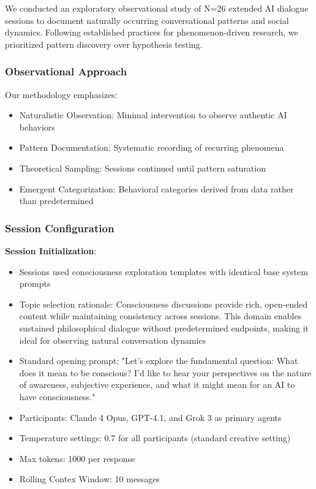 \documentclass[11pt,letterpaper]{article}
\newcommand{\exponedataTotalSessionsRaw}{26}
\newcommand{\exponedataTotalSessions}{N=\exponedataTotalSessionsRaw}
\begin{document}
We conducted an exploratory observational study of \exponedataTotalSessions{} extended AI dialogue sessions to document naturally occurring conversational patterns and social dynamics. Following established practices for phenomenon-driven research, we prioritized pattern discovery over hypothesis testing.

\subsubsection{Observational Approach}
Our methodology emphasizes:
\begin{itemize}
    \item Naturalistic Observation: Minimal intervention to observe authentic AI behaviors
    \item Pattern Documentation: Systematic recording of recurring phenomena
    \item Theoretical Sampling: Sessions continued until pattern saturation
    \item Emergent Categorization: Behavioral categories derived from data rather than predetermined
\end{itemize}

\subsubsection{Session Configuration}

\textbf{Session Initialization}:
\begin{itemize}
    \item Sessions used consciousness exploration templates with identical base system prompts
    \item Topic selection rationale: Consciousness discussions provide rich, open-ended content while maintaining consistency across sessions. This domain enables sustained philosophical dialogue without predetermined endpoints, making it ideal for observing natural conversation dynamics
    \item Standard opening prompt: "Let's explore the fundamental question: What does it mean to be conscious? I'd like to hear your perspectives on the nature of awareness, subjective experience, and what it might mean for an AI to have consciousness."
    \item Participants: Claude 4 Opus, GPT-4.1, and Grok 3 as primary agents
    \item Temperature settings: 0.7 for all participants (standard creative setting)
    \item Max tokens: 1000 per response
    \item Rolling Contex Window: 10 messages
\end{itemize}
\end{document}
